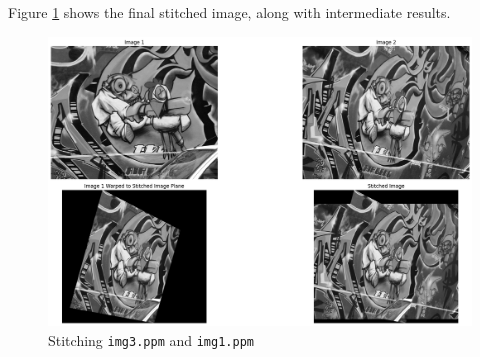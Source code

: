 \documentclass{article}[a4paper]
\begin{document}
	Figure \ref{q4} shows the final stitched image, along with intermediate results.

	\begin{figure}[H]
		\centering
		\includegraphics[width=\textwidth]{imgs/q4.png}
		\caption{Stitching \texttt{img3.ppm} and \texttt{img1.ppm}}
		\label{q4}
	\end{figure}
\end{document}
